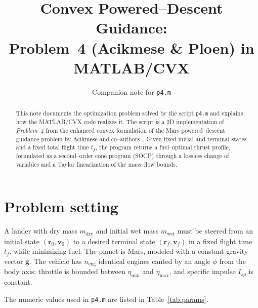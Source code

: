 \documentclass[11pt]{article}
\title{Convex Powered--Descent Guidance:\\
       Problem~4 (Acikmese \& Ploen) in MATLAB/CVX}
\author{Companion note for \texttt{p4.m}}
\date{}
\newcommand{\bv}[1]{\bm{#1}}
\begin{document}
\maketitle

\begin{abstract}
This note documents the optimization problem solved by the script
\texttt{p4.m} and explains how the MATLAB/CVX code realizes it.
The script is a 2D implementation of \emph{Problem~4} from the
enhanced convex formulation of the Mars powered--descent guidance
problem by Acikmese and co--authors~\cite{Acikmese2007,Acikmese2008}.
Given fixed initial and terminal states and a fixed total flight time
$t_f$, the program returns a fuel--optimal thrust profile, formulated
as a second--order cone program (SOCP) through a lossless change of
variables and a Taylor linearization of the mass--flow bounds.
\end{abstract}

\section{Problem setting}

A lander with dry mass $m_{\text{dry}}$ and initial wet mass
$m_{\text{wet}}$ must be steered from an initial state
$(\bv r_0,\bv v_0)$ to a desired terminal state $(\bv r_f,\bv v_f)$
in a fixed flight time $t_f$, while minimizing fuel.
The planet is Mars, modeled with a constant gravity
vector $\bv g$.  The vehicle has $n_{\text{eng}}$ identical engines
canted by an angle $\phi$ from the body axis; throttle is bounded
between $\eta_{\min}$ and $\eta_{\max}$, and specific impulse
$I_{sp}$ is constant.

The numeric values used in \texttt{p4.m} are listed in
Table~\ref{tab:params}.
\end{document}
